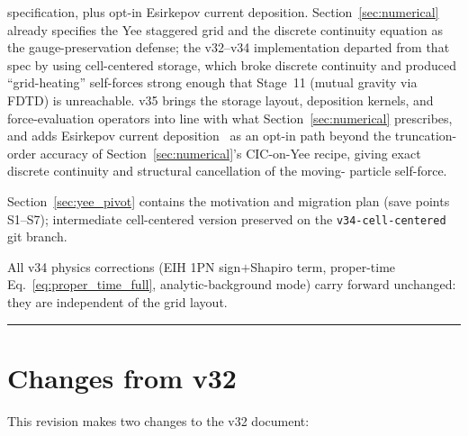 \documentclass[11pt,a4paper]{article}
\begin{document}
\begin{titlepage}
{  specification, plus opt-in Esirkepov current deposition.
  Section~\ref{sec:numerical} already specifies the Yee staggered
  grid and the discrete continuity equation as the gauge-preservation
  defense; the v32--v34 implementation departed from that spec by
  using cell-centered storage, which broke discrete continuity and
  produced ``grid-heating'' self-forces strong enough that Stage~11
  (mutual gravity via FDTD) is unreachable.  v35 brings the storage
  layout, deposition kernels, and force-evaluation operators into
  line with what Section~\ref{sec:numerical} prescribes, and adds
  Esirkepov current deposition~\cite{Esirkepov2001} as an opt-in
  path beyond the truncation-order accuracy of
  Section~\ref{sec:numerical}'s CIC-on-Yee recipe, giving exact
  discrete continuity and structural cancellation of the moving-
  particle self-force.\par
  Section~\ref{sec:yee_pivot} contains the motivation and migration
  plan (save points S1--S7); intermediate cell-centered version
  preserved on the \texttt{v34-cell-centered} git branch.\par
  All v34 physics corrections (EIH 1PN sign$+$Shapiro term,
  proper-time Eq.~\ref{eq:proper_time_full}, analytic-background
  mode) carry forward unchanged: they are independent of the grid
  layout.\par}
  \vspace{1.5cm}
  \hrule
\end{titlepage}

\tableofcontents
\newpage

\section*{Changes from v32}

This revision makes two changes to the v32 document:
\end{document}
